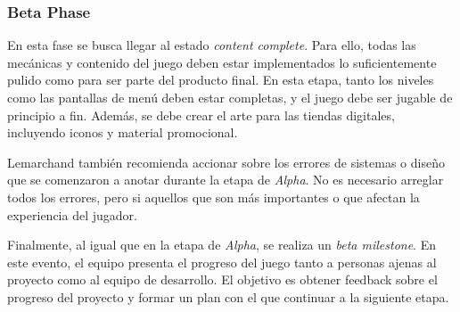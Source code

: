 \subsubsection{Beta Phase}
\par En esta fase se busca llegar al estado \textit{content complete}. Para ello, todas las mecánicas y contenido del juego deben estar implementados lo suficientemente pulido como para ser parte del producto final. En esta etapa, tanto los niveles como las pantallas de menú deben estar completas, y el juego debe ser jugable de principio a fin. Además, se debe crear el arte para las tiendas digitales, incluyendo iconos y material promocional.
\par Lemarchand también recomienda accionar sobre los errores de sistemas o diseño que se comenzaron a anotar durante la etapa de \textit{Alpha}. No es necesario arreglar todos los errores, pero si aquellos que son más importantes o que afectan la experiencia del jugador.
\bigbreak
\par Finalmente, al igual que en la etapa de \textit{Alpha}, se realiza un \textit{beta milestone}. En este evento, el equipo presenta el progreso del juego tanto a personas ajenas al proyecto como al equipo de desarrollo. El objetivo es obtener feedback sobre el progreso del proyecto y formar un plan con el que continuar a la siguiente etapa.
%
%
%

